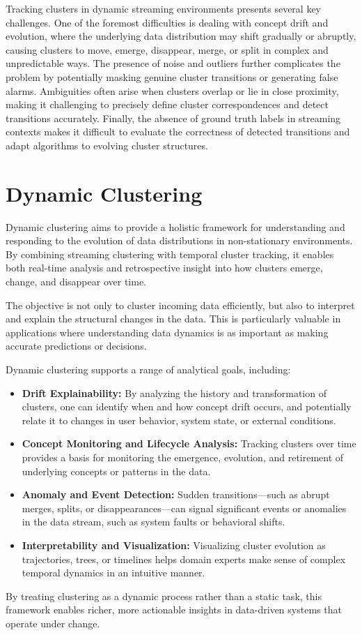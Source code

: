 Tracking clusters in dynamic streaming environments presents several key
challenges. One of the foremost difficulties is dealing with concept drift and
evolution, where the underlying data distribution may shift gradually or
abruptly, causing clusters to move, emerge, disappear, merge, or split in
complex and unpredictable ways. The presence of noise and outliers further
complicates the problem by potentially masking genuine cluster transitions or
generating false alarms. Ambiguities often arise when clusters overlap or lie
in close proximity, making it challenging to precisely define cluster
correspondences and detect transitions accurately. Finally, the absence of
ground truth labels in streaming contexts makes it difficult to evaluate the
correctness of detected transitions and adapt algorithms to evolving cluster
structures.

\section{Dynamic Clustering}\label{sec:dynamic_clustering}

Dynamic clustering aims to provide a holistic framework for understanding and
responding to the evolution of data distributions in non-stationary
environments. By combining streaming clustering with temporal cluster tracking,
it enables both real-time analysis and retrospective insight into how clusters
emerge, change, and disappear over time.

The objective is not only to cluster incoming data efficiently, but also to
interpret and explain the structural changes in the data. This is particularly
valuable in applications where understanding data dynamics is as important as
making accurate predictions or decisions.

Dynamic clustering supports a range of analytical goals, including:

\begin{itemize}
    \item \textbf{Drift Explainability:} By analyzing the history and transformation of
          clusters, one can identify when and how concept drift occurs, and potentially
          relate it to changes in user behavior, system state, or external conditions.

    \item \textbf{Concept Monitoring and Lifecycle Analysis:} Tracking clusters over time
          provides a basis for monitoring the emergence, evolution, and retirement of
          underlying concepts or patterns in the data.

    \item \textbf{Anomaly and Event Detection:} Sudden transitions—such as abrupt merges,
          splits, or disappearances—can signal significant events or anomalies in the data stream,
          such as system faults or behavioral shifts.

    \item \textbf{Interpretability and Visualization:} Visualizing cluster evolution as
          trajectories, trees, or timelines helps domain experts make sense of complex temporal
          dynamics in an intuitive manner.
\end{itemize}

By treating clustering as a dynamic process rather than a static task, this
framework enables richer, more actionable insights in data-driven systems that
operate under change.